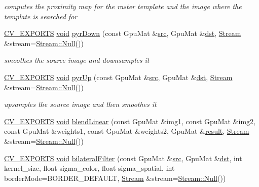 \begin{DoxyCompactItemize}
\begin{DoxyCompactList}\small\item\em computes the proximity map for the raster template and the image where the template is searched for \end{DoxyCompactList}\item 
\hyperlink{core_2types__c_8h_a1bf9f0e121b54272da02379cfccd0a2b}{C\-V\-\_\-\-E\-X\-P\-O\-R\-T\-S} \hyperlink{legacy_8hpp_a8bb47f092d473522721002c86c13b94e}{void} \hyperlink{namespacecv_1_1gpu_ad5b29e2b442c4a32e2d9abfa47c6a7dd}{pyr\-Down} (const Gpu\-Mat \&\hyperlink{legacy_8hpp_a371cd109b74033bc4366f584edd3dacc}{src}, Gpu\-Mat \&\hyperlink{photo__c_8h_aed13e2a25279b24dc954073233fef7a5}{dst}, \hyperlink{classcv_1_1gpu_1_1Stream}{Stream} \&stream=\hyperlink{classcv_1_1gpu_1_1Stream_af96c23564834f88333dcb8997df553f1}{Stream\-::\-Null}())
\begin{DoxyCompactList}\small\item\em smoothes the source image and downsamples it \end{DoxyCompactList}\item 
\hyperlink{core_2types__c_8h_a1bf9f0e121b54272da02379cfccd0a2b}{C\-V\-\_\-\-E\-X\-P\-O\-R\-T\-S} \hyperlink{legacy_8hpp_a8bb47f092d473522721002c86c13b94e}{void} \hyperlink{namespacecv_1_1gpu_a716abedb17a5b8a2cc598c7caa709c82}{pyr\-Up} (const Gpu\-Mat \&\hyperlink{legacy_8hpp_a371cd109b74033bc4366f584edd3dacc}{src}, Gpu\-Mat \&\hyperlink{photo__c_8h_aed13e2a25279b24dc954073233fef7a5}{dst}, \hyperlink{classcv_1_1gpu_1_1Stream}{Stream} \&stream=\hyperlink{classcv_1_1gpu_1_1Stream_af96c23564834f88333dcb8997df553f1}{Stream\-::\-Null}())
\begin{DoxyCompactList}\small\item\em upsamples the source image and then smoothes it \end{DoxyCompactList}\item 
\hyperlink{core_2types__c_8h_a1bf9f0e121b54272da02379cfccd0a2b}{C\-V\-\_\-\-E\-X\-P\-O\-R\-T\-S} \hyperlink{legacy_8hpp_a8bb47f092d473522721002c86c13b94e}{void} \hyperlink{namespacecv_1_1gpu_abebc3a4b8dd6bc54f138208ba2f71d66}{blend\-Linear} (const Gpu\-Mat \&img1, const Gpu\-Mat \&img2, const Gpu\-Mat \&weights1, const Gpu\-Mat \&weights2, Gpu\-Mat \&\hyperlink{legacy_8hpp_a0bb77d54f6769867cfdf389897bd8e43}{result}, \hyperlink{classcv_1_1gpu_1_1Stream}{Stream} \&stream=\hyperlink{classcv_1_1gpu_1_1Stream_af96c23564834f88333dcb8997df553f1}{Stream\-::\-Null}())
\item 
\hyperlink{core_2types__c_8h_a1bf9f0e121b54272da02379cfccd0a2b}{C\-V\-\_\-\-E\-X\-P\-O\-R\-T\-S} \hyperlink{legacy_8hpp_a8bb47f092d473522721002c86c13b94e}{void} \hyperlink{namespacecv_1_1gpu_a78e25a4694624715be0f24e182c81e7b}{bilateral\-Filter} (const Gpu\-Mat \&\hyperlink{legacy_8hpp_a371cd109b74033bc4366f584edd3dacc}{src}, Gpu\-Mat \&\hyperlink{photo__c_8h_aed13e2a25279b24dc954073233fef7a5}{dst}, int kernel\-\_\-size, float sigma\-\_\-color, float sigma\-\_\-spatial, int border\-Mode=B\-O\-R\-D\-E\-R\-\_\-\-D\-E\-F\-A\-U\-L\-T, \hyperlink{classcv_1_1gpu_1_1Stream}{Stream} \&stream=\hyperlink{classcv_1_1gpu_1_1Stream_af96c23564834f88333dcb8997df553f1}{Stream\-::\-Null}())

\end{DoxyCompactItemize}
